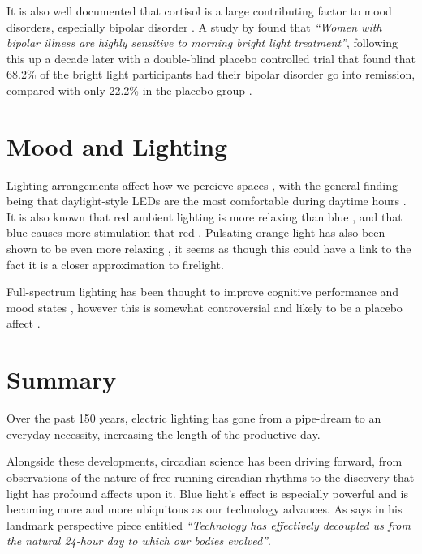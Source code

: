 It is also well documented that cortisol is a large contributing factor to mood disorders, especially bipolar disorder \citep{youngCortisolMoodDisorders2004}. A study by \citet{sitLightTherapyBipolar2007} found that \textit{``Women with bipolar illness are highly sensitive to morning bright light treatment''}, following this up a decade later with a double-blind placebo controlled trial that found that 68.2\% of the bright light participants had their bipolar disorder go into remission, compared with only 22.2\% in the placebo group \citep{sitAdjunctiveBrightLight2017}.

\section{Mood and Lighting}

Lighting arrangements affect how we percieve spaces \citep{durakImpactLightingArrangements2007}, with the general finding being that daylight-style LEDs are the most comfortable during daytime hours \citep{cajochenEffectDaylightLED2019}. It is also known that red ambient lighting is more relaxing than blue \citep{lauferPsychophysiologicalEffectsColoured2009}, and that blue causes more stimulation that red \citep{schweitzerInvestigationGenderAgerelated2016}. Pulsating orange light has also been shown to be even more relaxing \citep{wanInfluenceLightingColor2012}, it seems as though this could have a link to the fact it is a closer approximation to firelight.

Full-spectrum lighting has been thought to improve cognitive performance and mood states \citep{berryWorkEfficiencyMood1984}, however this is somewhat controversial and likely to be a placebo affect \citep{veitchDemandCharacteristicsFull1991}.



\section{Summary}
\label{sec:LitSummary}

Over the past 150 years, electric lighting has gone from a pipe-dream to an everyday necessity, increasing the length of the productive day. 

Alongside these developments, circadian science has been driving forward, from observations of the nature of free-running circadian rhythms to the discovery that light has profound affects upon it. Blue light's effect is especially powerful and is becoming more and more ubiquitous as our technology advances. As \citet{czeislerPerspectiveCastingLight2013} says in his landmark perspective piece entitled \textit{``Technology has effectively decoupled us from the natural 24-hour day to which our bodies evolved''}. 

